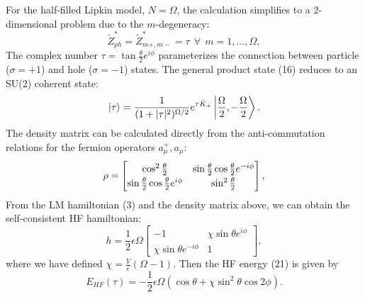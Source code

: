 \documentclass[prb,aps,twocolumn,showpacs,10pt]{revtex4-2}
\begin{document}
For the half-filled Lipkin model, $N = \Omega$, the calculation simplifies to a 2-dimensional problem due to the $m$-degeneracy:
\begin{equation}
\tilde{Z}_{ph}^* = \tilde{Z}_{m+, m-}^* = \tau \ \ \forall \ \  m=1, ..., \Omega,
\end{equation} 
The complex number $\tau=\tan \frac{\theta}{2} e^{i\phi}$ parameterizes the connection between particle ($\sigma=+1$) and hole ($\sigma=-1$) states. The general product state (16) reduces to an SU(2) coherent state:
\begin{equation}
\ket{\tau} = \frac{1}{(1+|\tau|^2)^{\Omega/2}}e^{\tau \hat{K}_+} \ket{\frac{\Omega}{2}, -\frac{\Omega}{2}}.
\end{equation}
The density matrix can be calculated directly from the anti-commutation relations for the fermion operators $a_\mu^+, a_\mu$:
\begin{equation}
\rho = 
\renewcommand{\arraystretch}{1.2}
\begin{bmatrix}
\cos^2\frac{\theta}{2} & \sin \frac{\theta}{2}  \cos \frac{\theta}{2}  e^{-i\phi}\\
\sin \frac{\theta}{2}  \cos \frac{\theta}{2}  e^{i\phi} & \sin^2\frac{\theta}{2} \\
\end{bmatrix}
,
\end{equation}
From the LM hamiltonian (3) and the density matrix above, we can obtain the self-consistent HF hamiltonian:
\begin{equation}
h = \frac{1}{2} \epsilon \Omega 
\begin{bmatrix}
-1 & \chi \sin \theta e^{i\phi} \\
 \chi \sin \theta e^{-i\phi}& 1
\end{bmatrix}
,
\end{equation}
where we have defined $\chi = \frac{V}{\epsilon}(\Omega-1)$. Then the HF energy (21) is given by
\begin{equation}
E_{HF} (\tau)= -\frac{1}{2} \epsilon \Omega ( \cos \theta + \chi \sin^2 \theta \cos 2\phi ).
\end{equation}
\end{document}
